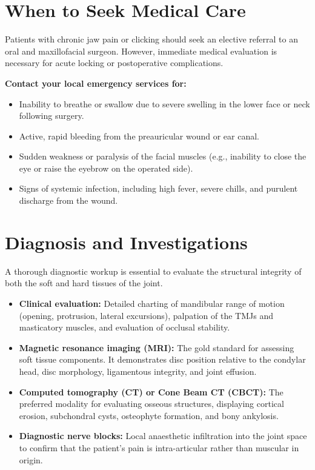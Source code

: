 \section*{When to Seek Medical Care}
Patients with chronic jaw pain or clicking should seek an elective referral to an oral and maxillofacial surgeon. However, immediate medical evaluation is necessary for acute locking or postoperative complications.

\textbf{Contact your local emergency services for:}
\begin{itemize}
    \item Inability to breathe or swallow due to severe swelling in the lower face or neck following surgery.
    \item Active, rapid bleeding from the preauricular wound or ear canal.
    \item Sudden weakness or paralysis of the facial muscles (e.g., inability to close the eye or raise the eyebrow on the operated side).
    \item Signs of systemic infection, including high fever, severe chills, and purulent discharge from the wound.
\end{itemize}

\section*{Diagnosis and Investigations}
A thorough diagnostic workup is essential to evaluate the structural integrity of both the soft and hard tissues of the joint.
\begin{itemize}
    \item \textbf{Clinical evaluation:} Detailed charting of mandibular range of motion (opening, protrusion, lateral excursions), palpation of the TMJs and masticatory muscles, and evaluation of occlusal stability.
    \item \textbf{Magnetic resonance imaging (MRI):} The gold standard for assessing soft tissue components. It demonstrates disc position relative to the condylar head, disc morphology, ligamentous integrity, and joint effusion.
    \item \textbf{Computed tomography (CT) or Cone Beam CT (CBCT):} The preferred modality for evaluating osseous structures, displaying cortical erosion, subchondral cysts, osteophyte formation, and bony ankylosis.
    \item \textbf{Diagnostic nerve blocks:} Local anaesthetic infiltration into the joint space to confirm that the patient's pain is intra-articular rather than muscular in origin.
\end{itemize}

